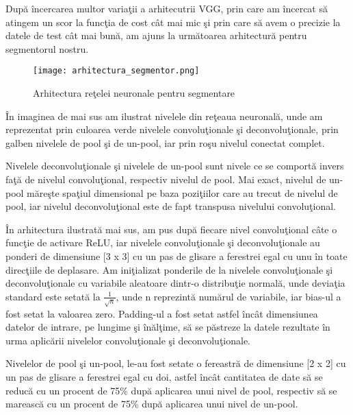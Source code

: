 Dup\u{a} \^{i}ncercarea multor varia\c{t}ii a arhitecutrii VGG, prin care am \^{i}ncercat s\u{a} atingem un scor la func\c{t}ia de cost c\^{a}t mai mic \c{s}i prin care s\u{a} avem o precizie la datele de test c\^{a}t mai bun\u{a}, am ajuns la urm\u{a}toarea arhitectur\u{a} pentru segmentorul nostru.


\begin{figure}[h!]
  \center
  \texttt{[image: arhitectura\_segmentor.png]}
  \caption{Arhitectura re\c{t}elei neuronale pentru segmentare}
\end{figure}

\^{I}n imaginea de mai sus am ilustrat nivelele din re\c{t}eaua neuronal\u{a}, unde am reprezentat prin culoarea verde nivelele convolu\c{t}ionale \c{s}i deconvolu\c{t}ionale, prin galben nivelele de pool \c{s}i de un-pool, iar prin ro\c{s}u nivelul conectat complet.

\par

Nivelele deconvolu\c{t}ionale \c{s}i nivelele de un-pool sunt nivele ce se comport\u{a} invers fa\c{t}\u{a} de nivelul convolu\c{t}ional, respectiv nivelul de pool. Mai exact, nivelul de un-pool m\u{a}re\c{s}te spa\c{t}iul dimensional pe baza pozi\c{t}iilor care au trecut de nivelul de pool, iar nivelul deconvolu\c{t}ional este de fapt transpusa nivelului convolu\c{t}ional.

\par

\^{I}n arhitectura ilustrat\u{a} mai sus, am pus dup\u{a} fiecare nivel convolu\c{t}ional c\^{a}te o func\c{t}ie de activare ReLU, iar nivelele convolu\c{t}ionale \c{s}i deconvolu\c{t}ionale au ponderi de dimensiune [3 x 3] cu un pas de glisare a ferestrei egal cu unu \^{i}n toate direc\c{t}iile de deplasare. Am ini\c{t}ializat ponderile de la nivelele convolu\c{t}ionale \c{s}i deconvolu\c{t}ionale cu variabile aleatoare dintr-o distribu\c{t}ie normal\u{a}, unde devia\c{t}ia standard este setat\u{a} la $\frac{1}{\sqrt{n}}$, unde n reprezint\u{a} num\u{a}rul de variabile, iar bias-ul a fost setat la valoarea zero. Padding-ul a fost setat astfel \^{i}nc\^{a}t dimensiunea datelor de intrare, pe lungime \c{s}i \^{i}n\u{a}l\c{t}ime, s\u{a} se p\u{a}streze la datele rezultate \^{i}n urma aplic\u{a}rii nivelelor convolu\c{t}ionale \c{s}i deconvolu\c{t}ionale.

\par

Nivelelor de pool \c{s}i un-pool, le-au fost setate o fereastr\u{a} de dimensiune [2 x 2] cu un pas de glisare a ferestrei egal cu doi, astfel \^{i}nc\^{a}t cantitatea de date s\u{a} se reduc\u{a} cu un procent de 75\% dup\u{a} aplicarea unui nivel de pool, respectiv s\u{a} se mareasc\u{a} cu un procent de 75\% dup\u{a} aplicarea unui nivel de un-pool.


